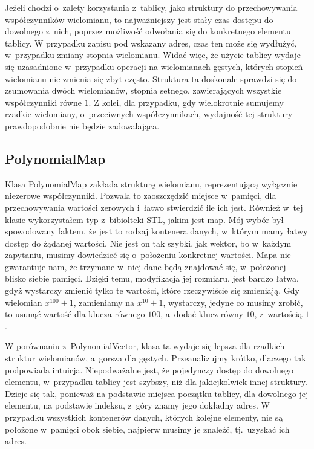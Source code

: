 Jeżeli chodzi o~zalety korzystania z~tablicy, jako struktury do przechowywania współczynników wielomianu, to najważniejszy jest stały czas dostępu do dowolnego z~nich, poprzez możliwość odwołania się do konkretnego elementu tablicy. W przypadku zapisu pod wskazany adres, czas ten może się wydłużyć, w~przypadku zmiany stopnia wielomianu. Widać więc, że użycie tablicy wydaje się uzasadnione w~przypadku operacji na wielomianach gęstych, których stopień wielomianu nie zmienia się zbyt często. Struktura ta doskonale sprawdzi się do zsumowania dwóch wielomianów, stopnia setnego, zawierających wszystkie współczynniki równe $1$. Z kolei, dla przypadku, gdy wielokrotnie sumujemy rzadkie wielomiany, o~przeciwnych współczynnikach, wydajność tej struktury prawdopodobnie nie będzie zadowalająca.

\subsection{PolynomialMap}

Klasa PolynomialMap zakłada strukturę wielomianu, reprezentującą wyłącznie niezerowe współczynniki.
Pozwala to zaoszczędzić miejsce w~pamięci, dla przechowywania wartości zerowych i~łatwo stwierdzić ile ich jest. Również w~tej klasie wykorzystałem typ z~bibiolteki STL, jakim jest map. Mój wybór był spowodowany faktem, że jest to rodzaj kontenera danych, w~którym mamy łatwy dostęp do żądanej wartości. Nie jest on tak szybki, jak wektor, bo w~każdym zapytaniu, musimy dowiedzieć się o~położeniu konkretnej wartości. Mapa nie gwarantuje nam, że trzymane w~niej dane będą znajdować się, w~położonej blisko siebie pamięci. Dzięki temu, modyfikacja jej rozmiaru, jest bardzo łatwa, gdyż wystarczy zmienić tylko te wartości, które rzeczywiście się zmieniają. Gdy wielomian $x^{100} + 1$, zamieniamy na $x^{10} + 1$, wystarczy, jedyne co musimy zrobić, to usunąć wartość dla klucza równego $100$, a~dodać klucz równy $10$, z~wartością $1$.

W porównaniu z~PolynomialVector, klasa ta wydaje się lepsza dla rzadkich struktur wielomianów, a~gorsza dla gęstych. Przeanalizujmy krótko, dlaczego tak podpowiada intuicja. Niepodważalne jest, że pojedynczy dostęp do dowolnego elementu, w~przypadku tablicy jest szybszy, niż dla jakiejkolwiek innej struktury. Dzieje się tak, ponieważ na podstawie miejsca początku tablicy, dla dowolnego jej elementu, na podstawie indeksu, z~góry znamy jego dokładny adres. W przypadku wszystkich kontenerów danych, których kolejne elementy, nie są położone w~pamięci obok siebie, najpierw musimy je znaleźć, tj.\ uzyskać ich adres.

